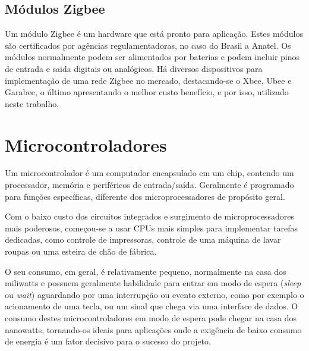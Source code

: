 \documentclass[tcc,capa]{texufpel}
\begin{document}
            
        
        \subsection{Módulos Zigbee}
        
            Um módulo Zigbee é um hardware que está pronto para aplicação. Estes módulos são certificados por agências regulamentadoras, no caso do Brasil a Anatel. Os módulos normalmente podem ser alimentados por baterias e podem incluir pinos de entrada e saida digitais ou analógicos.
            Há diversos dispositivos para implementação de uma rede Zigbee no mercado, destacando-se o Xbee, Ubee e Garabee, o último apresentando o melhor custo benefício, e por isso, utilizado neste trabalho. 
    
    
    \section{Microcontroladores}
    
        Um microcontrolador é um computador encapsulado em um chip, contendo um processador, memória e periféricos de entrada/saída. Geralmente é programado para funções específicas, diferente dos microprocessadores de propósito geral.
        
         Com o baixo custo dos circuitos integrados e surgimento de microprocessadores mais poderosos, começou-se a usar CPUs mais simples para implementar tarefas dedicadas, como controle de impressoras, controle de uma máquina de lavar roupas ou uma esteira de chão de fábrica.
        
        O seu consumo, em geral, é relativamente pequeno, normalmente na casa dos miliwatts e possuem geralmente habilidade para entrar em modo de espera (\textit{sleep} ou \textit{wait}) aguardando por uma interrupção ou evento externo, como por exemplo o acionamento de uma tecla, ou um sinal que chega via uma interface de dados. O consumo destes microcontroladores em modo de espera pode chegar na casa dos nanowatts, tornando-os ideais para aplicações onde a exigência de baixo consumo de energia é um fator decisivo para o sucesso do projeto.
    
\end{document}
